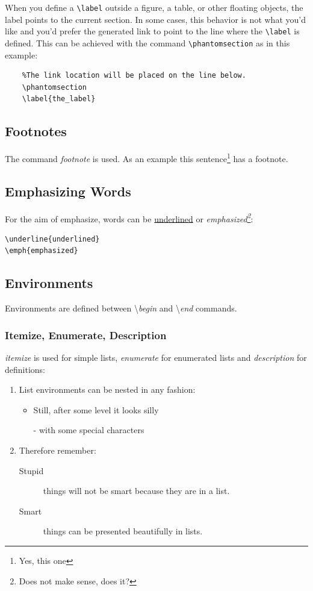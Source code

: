 \documentclass[10pt, a4paper]{article}
\begin{document}
When you define a \texttt{\textbackslash label} outside a figure, a table, or other floating objects, the label points to the current section. In some cases, this behavior is not what you'd like and you'd prefer the generated link to point to the line where the \texttt{\textbackslash label} is defined. This can be achieved with the command \texttt{\textbackslash phantomsection} as in this example:
\begin{verbatim}
	%The link location will be placed on the line below.
	\phantomsection
	\label{the_label}
\end{verbatim}
\subsection{Footnotes}
The command \textsl{footnote} is used. As an example this sentence\footnote{Yes, this one} has a footnote. 
\subsection{Emphasizing Words}
For the aim of emphasize, words can be \underline{underlined} or \emph{emphasized\footnote{Does not make sense, does it?}}:
\begin{verbatim}
\underline{underlined}
\emph{emphasized}
\end{verbatim}
\subsection{Environments}
Environments are defined between \textbackslash\textsl{begin} and \textbackslash\textsl{end} commands.

\subsubsection{Itemize, Enumerate, Description}
\emph{itemize} is used for simple lists, \emph{enumerate} for enumerated lists and \emph{description} for definitions:

\begin{enumerate}
\item List environments can be nested in any fashion:
\begin{itemize}
\item Still, after some level it looks silly
\item[-] with some special characters
\end{itemize}
\item Therefore remember:
\begin{description}
\item[Stupid] things will not be smart because they are in a list.
\item[Smart] things can be presented beautifully in lists.
\end{description}
\end{enumerate}
\end{document}
